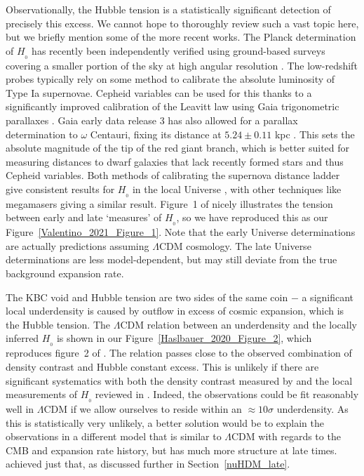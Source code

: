 \documentclass[fleqn,usenatbib,useAMS,onecolumn]{mnras} %
\begin{document}
Observationally, the Hubble tension \citep[reviewed in][]{Riess_2020} is a statistically significant detection of precisely this excess. We cannot hope to thoroughly review such a vast topic here, but we briefly mention some of the more recent works. The Planck determination of $H_{_0}$ \citep{Planck_2020} has recently been independently verified using ground-based surveys covering a smaller portion of the sky at high angular resolution \citep{Aiola_2020}. The low-redshift probes typically rely on some method to calibrate the absolute luminosity of Type Ia supernovae. Cepheid variables can be used for this thanks to a significantly improved calibration of the Leavitt law using Gaia trigonometric parallaxes \citep{Riess_2021}. Gaia early data release 3 \citep{Gaia_2021} has also allowed for a parallax determination to $\omega$ Centauri, fixing its distance at $5.24 \pm 0.11$ kpc \citep{Soltis_2021}. This sets the absolute magnitude of the tip of the red giant branch, which is better suited for measuring distances to dwarf galaxies that lack recently formed stars and thus Cepheid variables. Both methods of calibrating the supernova distance ladder give consistent results for $H_{_0}$ in the local Universe \citep[see also][]{Anand_2022}, with other techniques like megamasers \citep{Pesce_2020} giving a similar result. Figure~1 of \citet{Valentino_2021} nicely illustrates the tension between early and late `measures' of $H_{_0}$, so we have reproduced this as our Figure~\ref{Valentino_2021_Figure_1}. Note that the early Universe determinations are actually predictions assuming $\Lambda$CDM cosmology. The late Universe determinations are less model-dependent, but may still deviate from the true background expansion rate.

The KBC void and Hubble tension are two sides of the same coin $-$ a significant local underdensity is caused by outflow in excess of cosmic expansion, which is the Hubble tension. The $\Lambda$CDM relation between an underdensity and the locally inferred $H_{_0}$ is shown in our Figure~\ref{Haslbauer_2020_Figure_2}, which reproduces figure~2 of \citet{Haslbauer_2020}. The relation passes close to the observed combination of density contrast and Hubble constant excess. This is unlikely if there are significant systematics with both the density contrast measured by \citet{Keenan_2013} and the local measurements of $H_{_0}$ reviewed in \citet{Valentino_2021}. Indeed, the observations could be fit reasonably well in $\Lambda$CDM if we allow ourselves to reside within an $\approx 10\sigma$ underdensity. As this is statistically very unlikely, a better solution would be to explain the observations in a different model that is similar to $\Lambda$CDM with regards to the CMB and expansion rate history, but has much more structure at late times. \citet{Haslbauer_2020} achieved just that, as discussed further in Section~\ref{nuHDM_late}.
\end{document}
